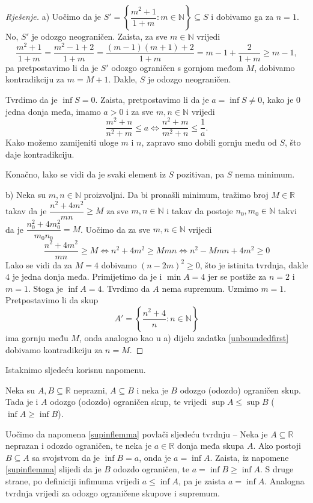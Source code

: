 \begin{proof}[Rješenje]
a) Uočimo da je $S'=\left\{\dfrac{m^2+1}{1+m} : m\in \mathbb{N}\right\}\subseteq S$ i dobivamo ga za $n=1$. No, $S'$ je odozgo neograničen. Zaista, za sve $m\in \mathbb{N}$ vrijedi
$$\dfrac{m^2+1}{1+m}=\dfrac{m^2-1+2}{1+m}=\dfrac{(m-1)(m+1)+2}{1+m}=m-1+\dfrac{2}{1+m}\geq m-1,$$
pa pretpostavimo li da je $S'$ odozgo ograničen s gornjom međom $M$, dobivamo kontradikciju za $m=M+1$. Dakle, $S$ je odozgo neograničen.

Tvrdimo da je $\inf{S}=0$. Zaista, pretpostavimo li da je $a=\inf{S}\neq 0$, kako je $0$ jedna donja međa, imamo $a>0$ i za sve $m, n\in \mathbb{N}$ vrijedi
$$\dfrac{m^2+n}{n^2+m}\leq a\Leftrightarrow \dfrac{n^2+m}{m^2+n}\leq \dfrac{1}{a}.$$
Kako možemo zamijeniti uloge $m$ i $n$, zapravo smo dobili gornju među od $S$, što daje kontradikciju.

Konačno, lako se vidi da je svaki element iz $S$ pozitivan, pa $S$ nema minimum.

b) Neka su \(m, n\in \mathbb{N}\) proizvoljni. Da bi pronašli minimum, tražimo broj \(M\in \mathbb{R}\) takav da je $\dfrac{n^2+4m^2}{mn}\geq M$ za sve $m, n\in \mathbb{N}$ i takav da postoje $n_0, m_0\in \mathbb{N}$ takvi da je $\dfrac{n_0^2+4m_0^2}{m_0n_0}=M$. Uočimo da za sve $m, n\in \mathbb{N}$ vrijedi
\[\dfrac{n^2+4m^2}{mn}\geq M\Leftrightarrow n^2+4m^2\geq Mmn\Leftrightarrow n^2-Mmn+4m^2\geq 0\]
Lako se vidi da za \(M=4\) dobivamo \((n-2m)^2\geq 0\), što je istinita tvrdnja, dakle \(4\) je jedna donja međa. Primijetimo da je i \(\min{A}=4\) jer se postiže za \(n=2\) i \(m=1\). Stoga je \(\inf{A}=4\). Tvrdimo da \(A\) nema supremum. Uzmimo \(m=1\). Pretpostavimo li da skup \[A'=\left\{\dfrac{n^2+4}{n} : n\in \mathbb{N}\right\}\] ima gornju među \(M\), onda analogno kao u a) dijelu zadatka \ref{unboundedfirst} dobivamo kontradikciju za \(n=M\).
\end{proof}
Istaknimo sljedeću korisnu napomenu.
\begin{remark}
\label{supinflemma}
Neka su \(A, B\subseteq \mathbb{R}\) neprazni, \(A\subseteq B\) i neka je \(B\) odozgo (odozdo) ograničen skup. Tada je i \(A\) odozgo (odozdo) ograničen skup, te vrijedi \(\sup{A}\leq \sup{B}\) (\(\inf{A}\geq \inf{B}\)).
\end{remark}
Uočimo da napomena \ref{supinflemma} povlači sljedeću tvrdnju -- Neka je \(A\subseteq \mathbb{R}\) neprazan i odozdo ograničen, te neka je \(a\in \mathbb{R}\) donja međa skupa \(A\). Ako postoji \(B\subseteq A\) sa svojstvom da je \(\inf{B}=a\), onda je \(a=\inf{A}\). Zaista, iz napomene \ref{supinflemma} slijedi da je \(B\) odozdo ograničen, te \(a=\inf{B}\geq \inf{A}\). S druge strane, po definiciji infimuma vrijedi \(a\leq \inf{A}\), pa je zaista \(a=\inf{A}\). Analogna tvrdnja vrijedi za odozgo ograničene skupove i supremum.
